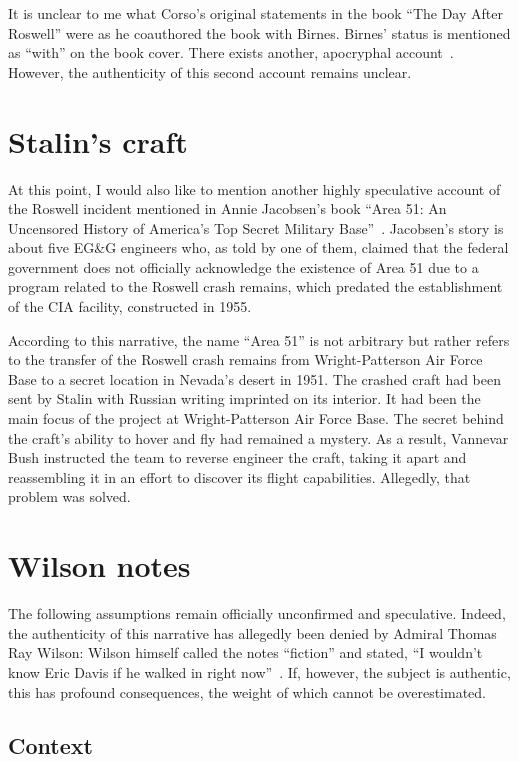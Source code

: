 It is unclear to me what Corso's original statements in the book ``The Day After Roswell'' were as he coauthored the book with Birnes. Birnes' status is mentioned as ``with'' on the book cover. There exists another, apocryphal account~\cite{Corso}. However, the authenticity of this second account remains unclear.

\section{Stalin's craft}
At this point, I would also like to mention another highly speculative account of the Roswell incident mentioned in Annie Jacobsen's book ``Area 51: An Uncensored History of America's Top Secret Military Base''~\cite{Jacobsen2011}. Jacobsen's story is about five EG{\&}G engineers who, as told by one of them, claimed that the federal government does not officially acknowledge the existence of Area 51 due to a program related to the Roswell crash remains, which predated the establishment of the CIA facility, constructed in 1955.

According to this narrative, the name ``Area 51'' is not arbitrary but rather refers to the transfer of the Roswell crash remains from Wright-Patterson Air Force Base to a secret location in Nevada's desert in 1951. The crashed craft had been sent by Stalin with Russian writing imprinted on its interior. It had been the main focus of the project at Wright-Patterson Air Force Base. The secret behind the craft's ability to hover and fly had remained a mystery. As a result, Vannevar Bush instructed the team to reverse engineer the craft, taking it apart and reassembling it in an effort to discover its flight capabilities. Allegedly, that problem was solved.

\section{Wilson notes}
\label{2023-UFO-part-Perception-crash-retreivals-wn}

The following assumptions remain officially unconfirmed and speculative.
Indeed, the authenticity of this narrative has allegedly been denied by Admiral Thomas Ray Wilson:
Wilson himself called the notes ``fiction'' and stated, ``I wouldn't know Eric Davis if he walked in right now''~\cite{cox20,Cox2021Aug}.
If, however, the subject is authentic, this has profound consequences, the weight of which cannot be overestimated.

\subsection{Context}

